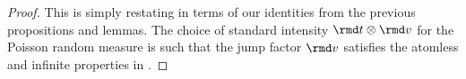 \begin{proof}
  \label{proof:theorem:jump-diffusion-characterizations}
  This is simply restating \cite[Theorems II.2.42, II.2.49, and III.2.26]{jacod2003} in terms of our identities from the previous propositions and lemmas.
  The choice of standard intensity $\rmd t \otimes \rmd\markVar$ for the Poisson random measure is such that the jump factor $\rmd\markVar$ satisfies the atomless and infinite properties in \cite[Remark III.2.28(3)]{jacod2003}.
\end{proof}
